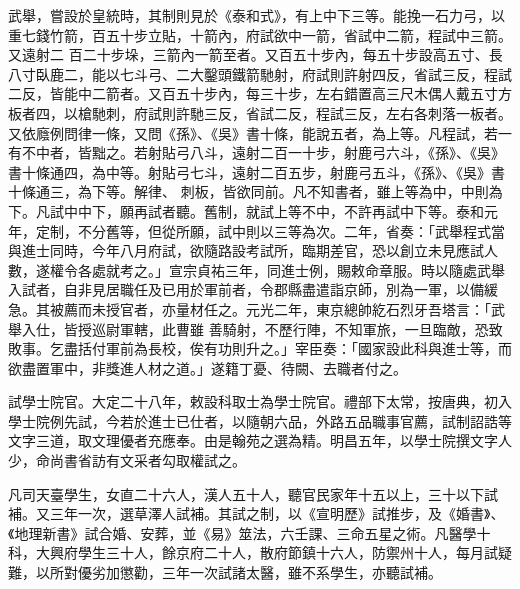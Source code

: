 \begin{pinyinscope}
 武舉，嘗設於皇統時，其制則見於《泰和式》，有上中下三等。能挽一石力弓，以重七錢竹箭，百五十步立貼，十箭內，府試欲中一箭，省試中二箭，程試中三箭。又遠射二
 百二十步垛，三箭內一箭至者。又百五十步內，每五十步設高五寸、長八寸臥鹿二，能以七斗弓、二大鑿頭鐵箭馳射，府試則許射四反，省試三反，程試二反，皆能中二箭者。又百五十步內，每三十步，左右錯置高三尺木偶人戴五寸方板者四，以槍馳刺，府試則許馳三反，省試二反，程試三反，左右各刺落一板者。又依廕例問律一條，又問《孫》、《吳》書十條，能說五者，為上等。凡程試，若一有不中者，皆黜之。若射貼弓八斗，遠射二百一十步，射鹿弓六斗，《孫》、《吳》書十條通四，為中等。射貼弓七斗，遠射二百五步，射鹿弓五斗，《孫》、《吳》書十條通三，為下等。解律、
 刺板，皆欲同前。凡不知書者，雖上等為中，中則為下。凡試中中下，願再試者聽。舊制，就試上等不中，不許再試中下等。泰和元年，定制，不分舊等，但從所願，試中則以三等為次。二年，省奏：「武舉程式當與進士同時，今年八月府試，欲隨路設考試所，臨期差官，恐以創立未見應試人數，遂權令各處就考之。」宣宗貞祐三年，同進士例，賜敕命章服。時以隨處武舉入試者，自非見居職任及已用於軍前者，令郡縣盡遣詣京師，別為一軍，以備緩急。其被薦而未授官者，亦量材任之。元光二年，東京總帥紇石烈牙吾塔言：「武舉入仕，皆授巡尉軍轄，此曹雖
 善騎射，不歷行陣，不知軍旅，一旦臨敵，恐致敗事。乞盡括付軍前為長校，俟有功則升之。」宰臣奏：「國家設此科與進士等，而欲盡置軍中，非獎進人材之道。」遂籍丁憂、待闕、去職者付之。



 試學士院官。大定二十八年，敕設科取士為學士院官。禮部下太常，按唐典，初入學士院例先試，今若於進士已仕者，以隨朝六品，外路五品職事官薦，試制詔誥等文字三道，取文理優者充應奉。由是翰苑之選為精。明昌五年，以學士院撰文字人少，命尚書省訪有文采者勾取權試之。



 凡司天臺學生，女直二十六人，漢人五十人，聽官民家年十五以上，三十以下試補。又三年一次，選草澤人試補。其試之制，以《宣明歷》試推步，及《婚書》、《地理新書》試合婚、安葬，並《易》筮法，六壬課、三命五星之術。凡醫學十科，大興府學生三十人，餘京府二十人，散府節鎮十六人，防禦州十人，每月試疑難，以所對優劣加懲勸，三年一次試諸太醫，雖不系學生，亦聽試補。



\end{pinyinscope}